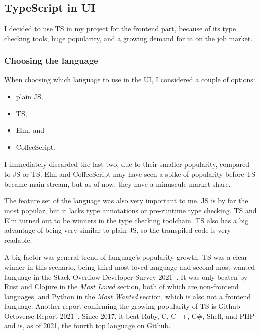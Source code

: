 \subsection{TypeScript in UI}\label{sec:typescript-in-ui}

I decided to use \acl{TS} in my project for the frontend part,
because of its type checking tools,
huge popularity,
and a growing demand for in on the job market.

\subsubsection{Choosing the language}\label{sec:choosing-the-language}

When choosing which language to use in the \ac{UI},
I considered a couple of options:

\begin{itemize}
      \item
            plain \acl{JS},
      \item
            \acl{TS},
      \item
            Elm, and
      \item
            CoffeeScript.
\end{itemize}

I immediately discarded the last two,
due to their smaller popularity,
compared to \acl{JS} or \acl{TS}.
Elm and CoffeeScript may have seen
a spike of popularity before \acl{TS}
became main stream,
but as of now, they have a minuscule market share.

The feature set of the language was also very important to me.
\Acl{JS} is by far the most popular,
but it lacks type annotations or pre-runtime type checking.
\Acl{TS} and Elm turned out to be winners in the type checking toolchain.
\Acl{TS} also has a big advantage of being very similar to plain \acl{JS},
so the transpiled code is very readable.

A big factor was general trend of language's popularity growth.
\Acl{TS} was a clear winner in this scenario,
being third most loved language
and second most wanted language
in the Stack Overflow Developer Survey 2021~\cite{stack_overflow_2021_2021}.
It was only beaten by Rust and Clojure
in the \textit{Most Loved} section,
both of which are non-frontend languages,
and Python in the \textit{Most Wanted} section,
which is also not a frontend language.
Another report confirming the growing popularity of \acl{TS}
is Github Octoverse Report 2021~\cite{github_inc_2021_2021}.
Since 2017,
it beat
Ruby,
C,
C++,
C\#,
Shell, and
\ac{PHP}
and is, as of 2021, the fourth top language on Github.

